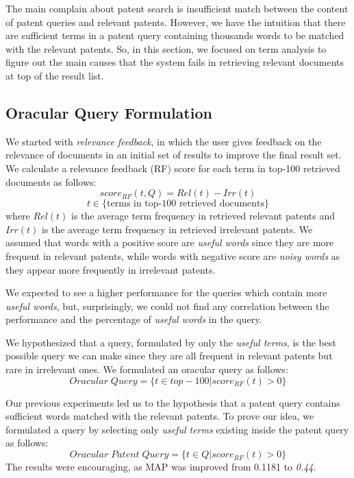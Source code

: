 The main complain about patent search is insufficient match between the content of patent queries and relevant
patents\cite{lupu2013patent}\cite{magdy2012toward}. However, we have the intuition that there are sufficient terms in a patent query containing thousands words to be matched with the relevant patents. So, in this section, we focused on term analysis to figure out the main causes that the system fails in retrieving relevant documents at top of the result list. 
\subsection{Oracular Query Formulation}
We started with {\em relevance feedback}, in which the user gives feedback on the relevance of documents in an initial set of results to improve the final result set. We calculate a relevance feedback (RF) score for each term in top-100 retrieved documents as follows:
\begin{equation}
score_{RF}(t,Q)=Rel(t)-Irr(t) 
 \label{eq:score}
\end{equation}\vspace*{-5ex}
\begin{displaymath}t\in \lbrace \mbox{terms in top-100 retrieved documents}\rbrace\end{displaymath}
where $ Rel(t) $ is the average term frequency in retrieved relevant patents and $ Irr(t) $ is the average term frequency in retrieved irrelevant patents. We assumed that words with a positive score are {\em useful words} since they are more frequent in relevant patents, while words with negative score are {\em noisy words} as they appear more frequently in irrelevant patents. 

We expected to see a higher performance for the queries which contain more {\em useful words}, but, surprisingly, we could not find any correlation between the performance and the percentage of {\em useful words} in the query. 

We hypothesized that a query, formulated by only the {\em useful terms}, is the best possible query we can make since they are all frequent in relevant patents but rare in irrelevant ones. We formulated an oracular query as follows: 
\begin{equation}
Oracular \; Query = \{t \in top-100|score_{RF}(t)>0\}   
 \label{eq:score}
\end{equation}

Our previous experiments led us to the hypothesis that a patent query contains sufficient words matched with the relevant patents.
To prove our idea, we formulated a query by selecting only {\em useful terms} existing inside the patent query as follows: 
\begin{equation}
 Oracular \; Patent \; Query = \{t\in Q|score_{RF}(t)>0\}   
 \label{eq:score}
\end{equation}
The results were encouraging, as MAP was improved from 0.1181 to {\em 0.44}.
